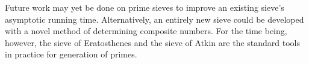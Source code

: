 \documentclass{amsart}
\theoremstyle{definition}
\theoremstyle{case}
\begin{document}
	Future work may yet be done on prime sieves to improve an existing sieve's asymptotic running time. Alternatively, an entirely new sieve could be developed with a novel method of determining composite numbers. For the time being, however, the sieve of Eratosthenes and the sieve of Atkin are the standard tools in practice for generation of primes.
	

	
	
\end{document}
